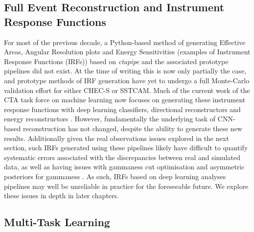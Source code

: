 \subsection{Full Event Reconstruction and Instrument Response Functions}
For most of the previous decade, a Python-based method of generating Effective Areas, Angular Resolution plots and Energy Sensitivities (examples of Instrument Response Functions (IRFs)) based on \textit{ctapipe} and the associated prototype pipelines did not exist. At the time of writing this is now only partially the case, and prototype methods of IRF generation have yet to undergo a full Monte-Carlo validation effort for either CHEC-S or SSTCAM. Much of the current work of the CTA task force on machine learning now focuses on generating these instrument response functions with deep learning classifiers, directional reconstructors and energy reconstructors \cite{tjarkicrc}. However, fundamentally the underlying task of CNN-based reconstruction has not changed, despite the ability to generate these new results. Additionally given the real observations issues explored in the next section, such IRFs generated using these pipelines likely have difficult to quantify systematic errors associated with the discrepancies between real and simulated data, as well as having issues with gammaness cut optimisation and asymmetric posteriors for gammaness \cite{mike}. As such, IRFs based on deep learning analyses pipelines may well be unreliable in practice for the foreseeable future. We explore these issues in depth in later chapters.

\subsection{Multi-Task Learning}


